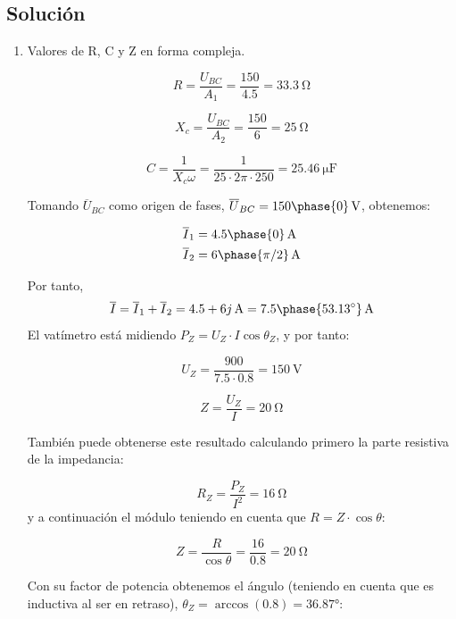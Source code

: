 \subsection*{Solución}
\begin{enumerate}
\item Valores de R, C y Z en forma compleja.
  
\begin{equation*}
    R = \frac{U_{BC}}{A_1} = \frac{150}{4.5} = \qty{33.3}{\ohm}
  \end{equation*}

  \begin{equation*}
    X_c = \frac{U_{BC}}{A_2} = \frac{150}{6} = \qty{25}{\ohm}
  \end{equation*}

  \begin{equation*}
    C = \frac{1}{X_c\omega} = \frac{1}{25 \cdot 2 \pi \cdot 250} = \qty{25.46}{\micro\farad}
  \end{equation*}

  Tomando $\overline{U}_{BC}$ como origen de fases, $\overline{U}_{BC} = \qty[parse-numbers=false]{150\phase{0}}{\volt}$, obtenemos:

  \begin{align*}
    \overline{I}_1 &= \qty[parse-numbers=false]{4.5\phase{0}}{\ampere}\\
    \overline{I}_2 &= \qty[parse-numbers=false]{6\phase{\pi/2}}{\ampere}
  \end{align*}

  Por tanto,
  \[
    \overline{I} = \overline{I}_1 + \overline{I}_2 = \qty[parse-numbers=false]{4.5+6j}{\ampere} = \qty[parse-numbers=false]{7.5\phase{\ang{53.13}}}{\ampere}
  \]
  El vatímetro está midiendo $P_Z = U_Z \cdot I \cos \theta_Z$, y por tanto:

  \[
    U_Z = \frac{900}{7.5 \cdot 0.8} = \qty{150}{\volt}
  \]

  \[
    Z = \frac{U_Z}{I} = \qty{20}{\ohm}
  \]

    También puede obtenerse este resultado calculando primero la parte resistiva de la impedancia:

  \[
    R_Z = \frac{P_Z}{I^2} = \qty{16}{\ohm}
  \]
  y a continuación el módulo teniendo en cuenta que $R = Z \cdot \cos \theta$:

  \[
    Z = \frac{R}{\cos \theta} = \frac{16}{0.8} = \qty{20}{\ohm}
  \]

  Con su factor de potencia obtenemos el ángulo (teniendo en cuenta que es inductiva al ser en retraso), $\theta_Z = \arccos(0.8) = \ang{36.87}$:


\end{enumerate}
